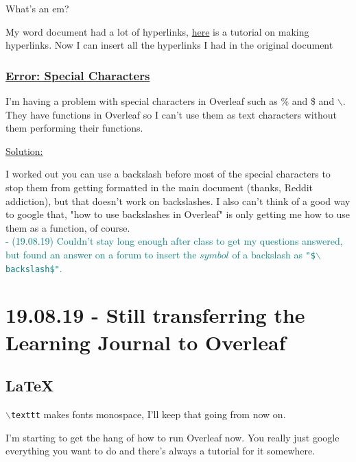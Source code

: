 \documentclass[12pt]{article}
\begin{document}
What's an em? 

\color{black}
My word document had a lot of hyperlinks, 
\href{https://www.overleaf.com/learn/latex/Hyperlinks}{here} is a tutorial on making hyperlinks. Now I can insert all the hyperlinks I had in the original document

\subsubsection{\underline{Error: Special Characters}}\label{error:er7}
\begin{addmargin}[1cm]{0cm}
I'm having a problem with special characters in Overleaf such as \% and \$ and $\backslash$. They have functions in Overleaf so I can't use them as text characters without them performing their functions.

\underline{Solution:}

I worked out you can use a backslash before most of the special characters to stop them from getting formatted in the main document (thanks, Reddit addiction), but that doesn't work on backslashes. I also can't think of a good way to google that, "how to use backslashes in Overleaf" is only getting me how to use them as a function, of course.
\\\textcolor{teal}{- (19.08.19) Couldn't stay long enough after class to get my questions answered, but found an answer on a forum to insert the $symbol$ of a backslash as \texttt{"\$$\backslash$backslash\$"}.}
\end{addmargin}

\section{19.08.19 - Still transferring the Learning Journal to Overleaf}
\subsection{LaTeX}

\texttt{$\backslash$texttt} makes fonts monospace, I'll keep that going from now on.

I'm starting to get the hang of how to run Overleaf now. You really just google everything you want to do and there's always a tutorial for it somewhere. 
\end{document}
